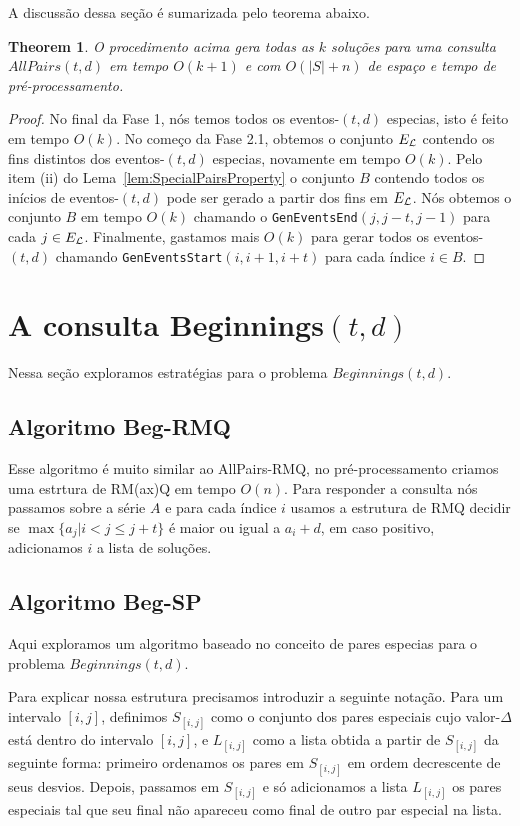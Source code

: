 \documentclass[dissertacao, brazil]{ThesisPUC}
\newtheorem{thm}{Theorem}[section]
\begin{document}
A discussão dessa seção é sumarizada pelo teorema abaixo.

\begin{thm}
O procedimento acima gera todas as $k$ soluções para uma consulta $AllPairs(t, d)$ em tempo $O(k + 1)$
e com $O(|S| + n)$ de espaço e tempo de pré-processamento.
\end{thm}
\begin{proof}
No final da Fase 1, nós temos todos os eventos-$(t,d)$ especias,
isto é feito em tempo $O(k)$. No começo da Fase 2.1,
obtemos o conjunto $E_{\cal{L}}$ contendo os fins distintos dos eventos-$(t,d)$ especias,
novamente em tempo $O(k)$. Pelo item (ii) do Lema~\ref{lem:SpecialPairsProperty}
o conjunto $B$ contendo todos os inícios de eventos-$(t,d)$ pode ser gerado a partir
dos fins em $E_{\cal{L}}$. Nós obtemos o conjunto $B$ em tempo $O(k)$ chamando o {\tt GenEventsEnd}$(j,j-t,j-1)$
para cada $j \in E_{\cal{L}}$. Finalmente, gastamos mais $O(k)$ para gerar todos os eventos-$(t,d)$
chamando {\tt GenEventsStart}$(i,i+1,i+t)$ para cada índice $i \in B$.
\end{proof}


\section{A consulta Beginnings$(t,d)$}

Nessa seção exploramos estratégias para o problema $Beginnings(t,d)$.

\subsection{Algoritmo Beg-RMQ}
Esse algoritmo é muito similar ao AllPairs-RMQ, no pré-processamento
criamos uma estrtura de RM(ax)Q em tempo $O(n)$. Para responder a consulta
nós passamos sobre a série $A$ e para cada índice $i$ usamos a estrutura
de RMQ decidir se $\max\{a_j | i < j \le j + t\}$ é maior ou igual a $a_i + d$,
em caso positivo, adicionamos $i$ a lista de soluções.

\subsection{Algoritmo Beg-SP}

Aqui exploramos um algoritmo baseado no conceito de pares especias para
o problema $Beginnings(t,d)$.

Para explicar nossa estrutura precisamos introduzir a seguinte notação.
Para um intervalo $[i, j]$, definimos $S_{[i,j]}$ como o conjunto
dos pares especiais cujo valor-$\Delta$ está dentro do intervalo $[i, j]$,
e $L_{[i, j]}$ como a lista obtida a partir de $S_{[i,j]}$ da seguinte forma:
 primeiro ordenamos os pares em $S_{[i, j]}$ em ordem decrescente de seus desvios. Depois, passamos em $S_{[i,j]}$
e só adicionamos a lista $L_{[i,j]}$ os pares especiais tal que seu final não apareceu como final de outro
par especial na lista.
\end{document}
